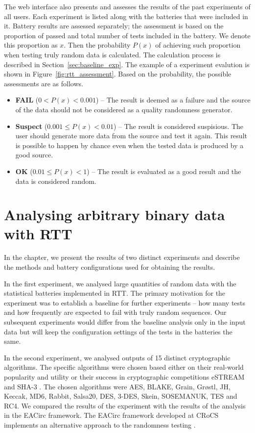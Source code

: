 \documentclass[
	digital,    %
	oneside,    %
	color,
	11pt,
	nocover,
	notable,
	nolof,
	nolot,
]{fithesis3}
\theoremstyle{definition}
\theoremstyle{remark}
\begin{document}
The web interface also presents and assesses the results of the past experiments of all users. Each experiment is listed along with the batteries that were included in it. Battery results are assessed separately; the assessment is based on the proportion of passed and total number of tests included in the battery. We denote this proportion as $x$. Then the probability $P(x)$ of achieving such proportion when testing truly random data is calculated. The calculation process is described in Section~\ref{sec:baseline_exp}. The example of a experiment evalution is shown in Figure~\ref{fig:rtt_assessment}. Based on the probability, the possible assessments are as follows.

\begin{itemize}
\item \textbf{FAIL} ($0 < P(x) < 0.001$) -- The result is deemed as a failure and the source of the data should not be considered as a quality randomness generator.
\item \textbf{Suspect} ($0.001 \leq P(x) < 0.01$) -- The result is considered suspisious. The user should generate more data from the source and test it again. This result is possible to happen by chance even when the tested data is produced by a good source.
\item \textbf{OK} ($0.01 \leq P(x) < 1$) -- The result is evaluated as a good result and the data is considered random.
\end{itemize}

\chapter{Analysing arbitrary binary data with RTT}
\label{chap:crypto_fn_analysis}

In the chapter, we present the results of two distinct experiments and describe the methods and battery configurations used for obtaining the results.

In the first experiment, we analysed large quantities of random data with the statistical batteries implemented in RTT. The primary motivation for the experiment was to establish a baseline for further experiments -- how many tests and how frequently are expected to fail with truly random sequences. Our subsequent experiments would differ from the baseline analysis only in the input data but will keep the configuration settings of the tests in the batteries the same.

In the second experiment, we analysed outputs of 15 distinct cryptographic algorithms. The specific algorithms were chosen based either on their real-world popularity and utility or their success in cryptographic competitions eSTREAM \cite{estream-competition} and SHA-3 \cite{sha3-competition}. The chosen algorithms were AES, BLAKE, Grain, Gr\o stl, JH, Keccak, MD6, Rabbit, Salsa20, DES, 3-DES, Skein, SOSEMANUK, TES and RC4. We compared the results of the experiment with the results of the analysis in the EACirc framework. The EACirc framework developed at CRoCS implements an alternative approach to the randomness testing \cite{eacirc-github}.
\end{document}

